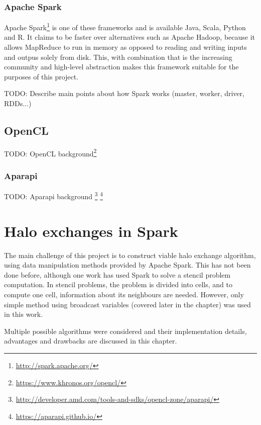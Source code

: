 \documentclass{l4proj}
\begin{document}
\subsection{Apache Spark}

Apache Spark\footnote{\url{http://spark.apache.org/}} is one of these frameworks and is available Java, Scala, Python and R. It claims
to be faster over alternatives such as Apache Hadoop, because it allows MapReduce to run in
memory as opposed to reading and writing inputs and outpus solely from disk. This, with combination
that is the increasing community and high-level abstraction makes this framework suitable for the purposes
of this project.	

TODO: Describe main points about how Spark works (master, worker, driver, RDDs...)

\section{OpenCL}

TODO: OpenCL background\footnote{\url{https://www.khronos.org/opencl/}}
\subsection{Aparapi}
TODO: Aparapi background
\footnote{\url{http://developer.amd.com/tools-and-sdks/opencl-zone/aparapi/}}
\footnote{\url{https://aparapi.github.io/}}

\chapter{Halo exchanges in Spark}
\label{chap:halos}

The main challenge of this project is to construct viable halo exchange algorithm, using 
data manipulation methods provided by Apache Spark. This has not been done before, although
one work\cite{seismic_spark} has used Spark to solve a stencil problem computation. In stencil
problems, the problem is divided into cells, and to compute one cell, information about its
neighbours are needed. However, only simple method using broadcast variables (covered later in the chapter)
was used in this work.

Multiple possible algorithms were considered and their implementation details, advantages
and drawbacks are discussed in this chapter.
\end{document}
